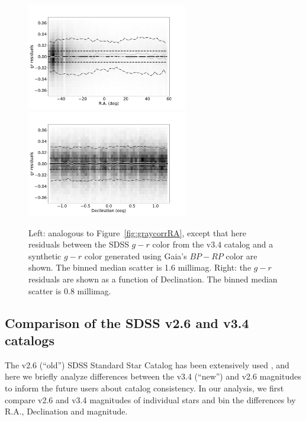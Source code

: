 \begin{figure}[th!]
    \centering\includegraphics[width=7cm]{figures/colorResidGaiaColors_gr_RA_Hess.png} 
    \centering\includegraphics[width=7cm]{figures/colorResidGaiaColors_gr_Dec_Hess.png} 
\caption{Left: analogous to Figure~\ref{fig:graycorrRA}, except that here residuals between
the SDSS $g-r$ color from the v3.4 catalog and a synthetic $g-r$ color generated using 
Gaia's $BP-RP$ color are shown. The binned median scatter is 1.6 millimag. Right: the 
$g-r$ residuals are shown as a function of Declination. The binned median scatter is 
0.8 millimag.}
\label{fig:grVSgaiaRADec}
\end{figure}
 

\subsection{Comparison of the SDSS v2.6 and v3.4 catalogs \label{sec:v26v34}} 
 
The v2.6 (``old'') SDSS Standard Star Catalog has been extensively used 
\citep[e.g.,][]{2008AJ....135..338F},
and here we briefly analyze differences between the v3.4 (``new'') and v2.6 magnitudes
to inform the future users about catalog consistency. 
In our analysis, we first compare v2.6 and v3.4 magnitudes of individual stars and 
bin the differences by R.A., Declination and magnitude. 

